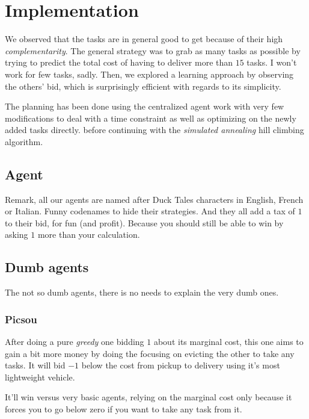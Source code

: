 \documentclass[11pt,a4paper]{article}
\begin{document}
\newpage

\section*{Implementation}

We observed that the tasks are in general good to get because of their high
\emph{complementarity}. The general strategy was to grab as many tasks as
possible by trying to predict the total cost of having to deliver more than
$15$ tasks. I won't work for few tasks, sadly. Then, we explored a learning
approach by observing the others' bid, which is surprisingly efficient with
regards to its simplicity.

The planning has been done using the centralized agent work with very few
modifications to deal with a time constraint as well as optimizing on the
newly added tasks directly. before continuing with the \emph{simulated
annealing} hill climbing algorithm.


\subsection*{Agent}

Remark, all our agents are named after Duck Tales characters in English,
French or Italian. Funny codenames to hide their strategies. And they all add
a tax of $1$ to their bid, for fun (and profit). Because you should still be
able to win by asking $1$ more than your calculation.

\subsection*{Dumb agents}

The not so dumb agents, there is no needs to explain the very dumb ones.

\subsubsection*{Picsou}

After doing a pure \emph{greedy} one bidding $1$ about its marginal cost, this
one aims to gain a bit more money by doing the focusing on evicting the other
to take any tasks. It will bid $-1$ below the cost from pickup to delivery
using it's most lightweight vehicle.

It'll win versus very basic agents, relying on the marginal cost only because
it forces you to go below zero if you want to take any task from it.
\end{document}
